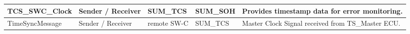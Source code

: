 \begin{longtable}{|l|l|l|l|l|}
\hline\hline
\endhead
\hline
\endfoot
\hline
\endlastfoot
\begin{minipage}{0.32\linewidth}\raggedright\vspace{.75ex}TCS\_SWC\_Clock\vspace{.75ex}\end{minipage} & \begin{minipage}{0.11\linewidth}\raggedright\vspace{.75ex}Sender / Receiver\vspace{.75ex}\end{minipage} & \begin{minipage}{0.11\linewidth}\raggedright\vspace{.75ex}SUM\_TCS\vspace{.75ex}\end{minipage} & \begin{minipage}{0.11\linewidth}\raggedright\vspace{.75ex}SUM\_SOH\vspace{.75ex}\end{minipage} & \begin{minipage}{0.21\linewidth}\raggedright\vspace{.75ex}Provides timestamp data for error monitoring.\vspace{.75ex}\end{minipage}\\\hline
\begin{minipage}{0.32\linewidth}\raggedright\vspace{.75ex}TimeSyncMessage\vspace{.75ex}\end{minipage} & \begin{minipage}{0.11\linewidth}\raggedright\vspace{.75ex}Sender / Receiver\vspace{.75ex}\end{minipage} & \begin{minipage}{0.11\linewidth}\raggedright\vspace{.75ex}remote SW-C\vspace{.75ex}\end{minipage} & \begin{minipage}{0.11\linewidth}\raggedright\vspace{.75ex}SUM\_TCS\vspace{.75ex}\end{minipage} & \begin{minipage}{0.21\linewidth}\raggedright\vspace{.75ex}Master Clock Signal received from TS\_Master ECU.\vspace{.75ex}\end{minipage}\\\hline

\end{longtable}
